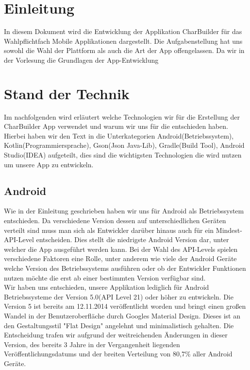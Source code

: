 \newpage
\section{Einleitung}
In diesem Dokument wird die Entwicklung der Applikation CharBuilder für das Wahlpflichtfach Mobile Applikationen dargestellt. Die Aufgabenstellung hat uns sowohl die Wahl der Plattform als auch die Art der App offengelassen. Da wir in der Vorlesung die Grundlagen der App-Entwicklung

\section{Stand der Technik}
Im nachfolgenden wird erläutert welche Technologien wir für die Erstellung der CharBuilder App verwendet
und warum wir uns für die entschieden haben. Hierbei haben wir den Text in die Unterkategorien Android(Betriebssystem), Kotlin(Programmiersprache), Gson(Json Java-Lib), Gradle(Build Tool), Android Studio(IDEA) aufgeteilt, dies sind die wichtigsten Technologien die wird nutzen um unsere App zu entwickeln.

\subsection{Android}
Wie in der Einleitung geschrieben haben wir uns für Android als Betriebssystem entschieden. Da verschiedene Version dessen auf unterschiedlichen Geräten verteilt sind
muss man sich als Entwickler darüber hinaus auch für ein Mindest-API-Level entscheiden. Dies stellt die niedrigste Android Version dar, unter welcher die App ausgeführt werden kann.
Bei der Wahl des API-Levels spielen verschiedene Faktoren eine Rolle, unter anderem wie viele der Android Geräte welche Version des Betriebssystems ausführen oder ob der Entwickler
Funktionen nutzen möchte die erst ab einer bestimmten Version verfügbar sind.\\
Wir haben uns entschieden, unsere Applikation lediglich für Android Betriebssysteme der Version 5.0(API Level 21) oder höher zu entwickeln.
Die Version 5 ist bereits am 12.11.2014 veröffentlicht worden und bringt einen großen Wandel in der Benutzeroberfläche durch Googles Material Design.
Dieses ist an den Gestaltungsstil "Flat Design" angelehnt und minimalistisch gehalten. Die Entscheidung trafen wir aufgrund der weitreichenden 
Änderungen in dieser Version, des bereits 3 Jahre in der Vergangenheit liegenden Veröffentlichungsdatums und der breiten Verteilung von 80,7\% aller Android Geräte.


